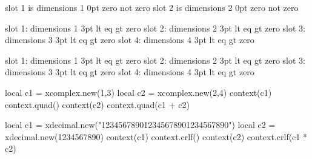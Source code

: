 \startbuffer
slot 1 is \ifboolean\arrayequals dimensions 1 0pt zero \else not zero \fi\quad
slot 2 is \ifboolean\arrayequals dimensions 2 0pt zero \else not zero \fi
\stopbuffer

\typebuffer

\getbuffer

\startbuffer
slot 1: \ifcase\arraycompare dimensions 1 3pt lt \or eq \else gt \fi zero\quad
slot 2: \ifcase\arraycompare dimensions 2 3pt lt \or eq \else gt \fi zero\quad
slot 3: \ifcase\arraycompare dimensions 3 3pt lt \or eq \else gt \fi zero\quad
slot 4: \ifcase\arraycompare dimensions 4 3pt lt \or eq \else gt \fi zero

slot 1: \ifcmpdim\arrayvalue dimensions 1 3pt lt \or eq \else gt \fi zero\quad
slot 2: \ifcmpdim\arrayvalue dimensions 2 3pt lt \or eq \else gt \fi zero\quad
slot 3: \ifcmpdim\arrayvalue dimensions 3 3pt lt \or eq \else gt \fi zero\quad
slot 4: \ifcmpdim\arrayvalue dimensions 4 3pt lt \or eq \else gt \fi zero
\stopbuffer

\typebuffer

\getbuffer

\stoptitle

\starttitle[title=Complex numbers]

\startbuffer
\startluacode
local c1 = xcomplex.new(1,3)
local c2 = xcomplex.new(2,4)
context(c1) context.quad() context(c2) context.quad(c1 + c2)
\stopluacode
\stopbuffer

\typebuffer \getbuffer

\stoptitle

\starttitle[title=Decimal numbers]

\startbuffer
\startluacode
local c1 = xdecimal.new("123456789012345678901234567890")
local c2 = xdecimal.new(1234567890)
context(c1) context.crlf() context(c2) context.crlf(c1 * c2)
\stopluacode
\stopbuffer

\typebuffer \getbuffer

\stoptitle

\stopdocument

